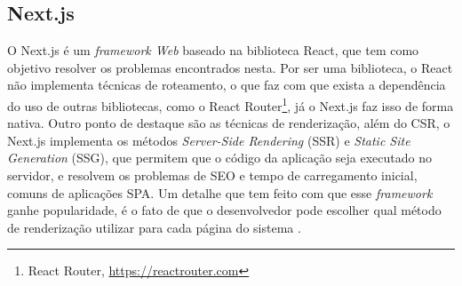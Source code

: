 \subsection{Next.js}
\label{sec-fundteo-framework-next}
O Next.js é um \textit{framework Web} baseado na biblioteca React, que tem como objetivo 
resolver os problemas encontrados nesta. Por ser uma biblioteca, o React não implementa 
técnicas de roteamento, o que faz com que exista a dependência do uso de outras bibliotecas, 
como o React Router\footnote{React Router, \url{https://reactrouter.com}},
já o Next.js faz isso de forma nativa. Outro ponto de destaque são as técnicas de renderização, 
além do CSR, o Next.js implementa os métodos \textit{Server-Side Rendering} (SSR)
e \textit{Static Site Generation} (SSG), que permitem que o código da aplicação seja executado
no servidor, e resolvem os problemas de SEO e tempo de carregamento inicial, comuns de 
aplicações SPA. Um detalhe que tem feito com que esse \textit{framework}
ganhe popularidade, é o fato de que o desenvolvedor pode escolher qual método de renderização
utilizar para cada página do sistema \cite{nextjs:2023}.

